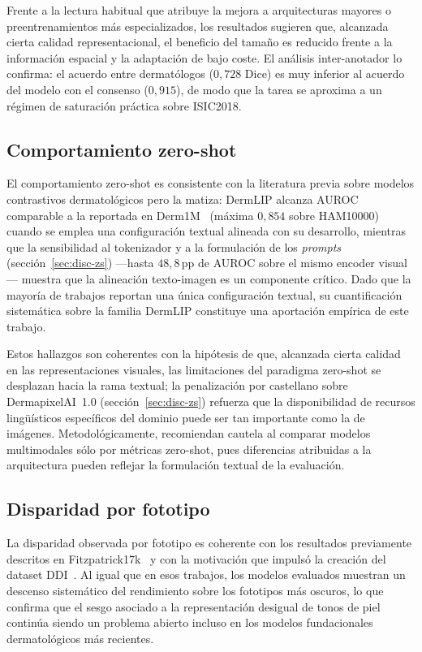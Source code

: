 Frente a la lectura habitual que atribuye la mejora a arquitecturas
mayores o preentrenamientos más especializados, los resultados sugieren
que, alcanzada cierta calidad representacional, el beneficio del tamaño
es reducido frente a la información espacial y la adaptación de bajo
coste. El análisis inter-anotador lo confirma: el acuerdo entre
dermatólogos ($0{,}728$ Dice) es muy inferior al acuerdo del modelo con
el consenso ($0{,}915$), de modo que la tarea se aproxima a un régimen de
saturación práctica sobre ISIC2018.

\subsection{Comportamiento zero-shot}
\label{sec:lit-zs}

El comportamiento zero-shot es consistente con la literatura previa
sobre modelos contrastivos dermatológicos pero la matiza: DermLIP
alcanza AUROC comparable a la reportada en Derm1M~\cite{derm1m} (máxima
$0{,}854$ sobre HAM10000) cuando se emplea una configuración textual
alineada con su desarrollo, mientras que la sensibilidad al tokenizador
y a la formulación de los \emph{prompts} (sección~\ref{sec:disc-zs})
---hasta $48{,}8$\,pp de AUROC sobre el mismo encoder visual--- muestra
que la alineación texto-imagen es un componente crítico. Dado que la
mayoría de trabajos reportan una única configuración textual, su
cuantificación sistemática sobre la familia DermLIP constituye una
aportación empírica de este trabajo.

Estos hallazgos son coherentes con la hipótesis de que, alcanzada cierta
calidad en las representaciones visuales, las limitaciones del paradigma
zero-shot se desplazan hacia la rama textual; la penalización por
castellano sobre DermapixelAI~1.0 (sección~\ref{sec:disc-zs}) refuerza
que la disponibilidad de recursos lingüísticos específicos del dominio
puede ser tan importante como la de imágenes. Metodológicamente,
recomiendan cautela al comparar modelos multimodales sólo por métricas
zero-shot, pues diferencias atribuidas a la arquitectura pueden reflejar
la formulación textual de la evaluación.

\subsection{Disparidad por fototipo}
\label{sec:lit-equidad}

La disparidad observada por fototipo es coherente con los resultados
previamente descritos en Fitzpatrick17k~\cite{fitzpatrick17k} y con la
motivación que impulsó la creación del dataset DDI~\cite{ddi}. Al igual
que en esos trabajos, los modelos evaluados muestran un descenso
sistemático del rendimiento sobre los fototipos más oscuros, lo que
confirma que el sesgo asociado a la representación desigual de tonos de
piel continúa siendo un problema abierto incluso en los modelos
fundacionales dermatológicos más recientes.

